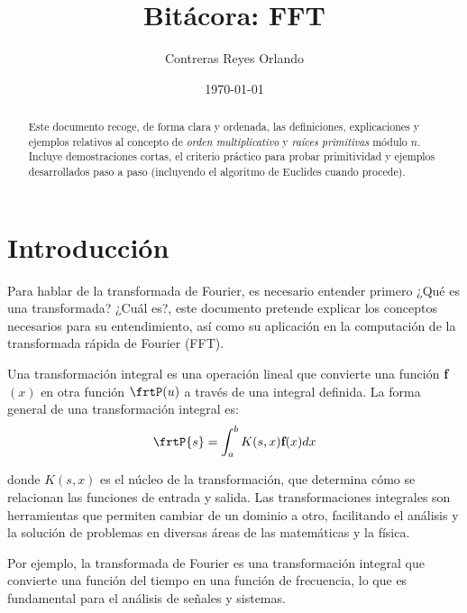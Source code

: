 \documentclass[12pt]{article}
\title{Bitácora: FFT}
\author{Contreras Reyes Orlando}
\date{\today}
\begin{document}
\maketitle
\begin{abstract}
Este documento recoge, de forma clara y ordenada, las definiciones, explicaciones y ejemplos relativos al concepto de \emph{orden multiplicativo} y \emph{raíces primitivas} módulo $n$. Incluye demostraciones cortas, el criterio práctico para probar primitividad y ejemplos desarrollados paso a paso (incluyendo el algoritmo de Euclides cuando procede).
\end{abstract}

\section{Introducción}
Para hablar de la transformada de Fourier, es necesario entender primero ¿Qué es una transformada? ¿Cuál es?, este documento pretende explicar los conceptos necesarios para su entendimiento, así como su aplicación en la computación de la transformada rápida de Fourier (FFT).
\newpage
\tableofcontents
\newpage

Una transformación integral es una operación lineal que convierte una función \textbf{f}$(x)$ en otra función $\frtP(u)$ a través de una integral definida. La forma general de una transformación integral es:
$$\frtP{s} = \int_{a}^{b} K(s, x) \textbf{f}(x) dx$$

donde $K(s, x)$ es el núcleo de la transformación, que determina cómo se relacionan las funciones de entrada y salida. Las transformaciones integrales son herramientas que permiten cambiar de un dominio a otro, facilitando el análisis y la solución de problemas en diversas áreas de las matemáticas y la física.

Por ejemplo, la transformada de Fourier es una transformación integral que convierte una función del tiempo en una función de frecuencia, lo que es fundamental para el análisis de señales y sistemas.
\end{document}
